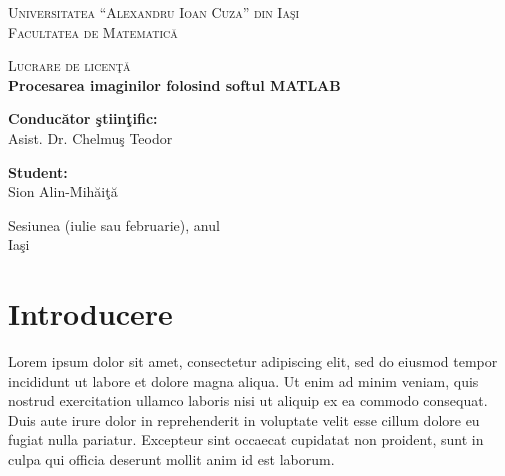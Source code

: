 \documentclass[11pt,a4paper]{report}
\begin{document}

\begin{titlepage}
\begin{center}

\large
\textsc{Universitatea ``Alexandru Ioan Cuza'' din Ia\c{s}i}\\
\textsc{Facultatea de Matematic\u{a}}


\vfill

\Huge
\textsc{Lucrare de licen\c t\u a}\\[0.8cm]
\huge
\textbf{Procesarea imaginilor folosind softul MATLAB}

\vfill

\begin{minipage}[t]{0.49\textwidth}

\begin{flushleft}
\large
\textbf{Conduc\u{a}tor \c{s}tiin\c{t}ific:}\\
{Asist. Dr. Chelmuş Teodor}
\end{flushleft}
\end{minipage}
\hfill
\begin{minipage}[t]{0.49\textwidth}
\begin{flushright}
\large
\textbf{Student:} \\
{Sion Alin-Mih\u{a}i\c{t}\u{a}}\\
\end{flushright}
\end{minipage}

\vfill

\large
\centering
Sesiunea (iulie sau februarie), anul\\
Ia\c{s}i
\end{center}
\end{titlepage}

\tableofcontents
\thispagestyle{empty}
\fancyhf{}
\clearpage
{}

\chapter*{Introducere}

Lorem ipsum dolor sit amet, consectetur adipiscing elit, sed do eiusmod tempor incididunt ut labore et dolore magna aliqua. Ut enim ad minim veniam, quis nostrud exercitation ullamco laboris nisi ut aliquip ex ea commodo consequat. Duis aute irure dolor in reprehenderit in voluptate velit esse cillum dolore eu fugiat nulla pariatur. Excepteur sint occaecat cupidatat non proident, sunt in culpa qui officia deserunt mollit anim id est laborum.
\end{document}
